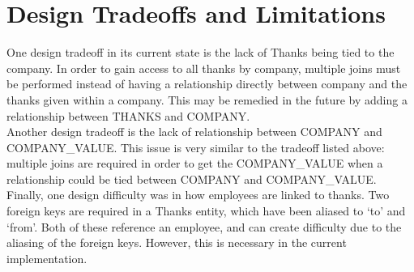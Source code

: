 \documentclass[11pt]{report}
\begin{document}
\section{Design Tradeoffs and Limitations}

One design tradeoff in its current state is the lack of Thanks being tied to the company. In order to gain access to all thanks by company, multiple joins must be performed instead of having a relationship directly between company and the thanks given within a company. This may be remedied in the future by adding a relationship between THANKS and COMPANY.\\

Another design tradeoff is the lack of relationship between COMPANY and COMPANY\_VALUE. This issue is very similar to the tradeoff listed above: multiple joins are required in order to get the COMPANY\_VALUE when a relationship could be tied between COMPANY and COMPANY\_VALUE.\\

Finally, one design difficulty was in how employees are linked to thanks. Two foreign keys are required in a Thanks entity, which have been aliased to `to' and `from'. Both of these reference an employee, and can create difficulty due to the aliasing of the foreign keys. However, this is necessary in the current implementation.
\end{document}
